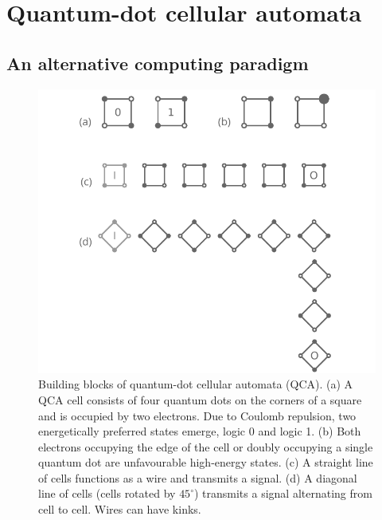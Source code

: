 \chapter{Quantum-dot cellular automata}
\label{ch:QCA_intro}
\graphicspath{{../gfx/chapter01/}}



\section{An alternative computing paradigm}

\begin{figure}
  \center
  \includegraphics{intro_qca}
  \caption{
Building blocks of quantum-dot cellular automata (QCA). (a) A QCA cell consists
of four quantum dots on the corners of a square and is occupied by two
electrons. Due to Coulomb repulsion, two energetically preferred states emerge,
logic 0 and logic 1. (b) Both electrons occupying the edge of the cell or
doubly occupying a single quantum dot are unfavourable high-energy states. (c) A
straight line of cells functions as a wire and transmits a signal. (d) A
diagonal line of cells (cells rotated by $45^{\circ}$) transmits a signal
alternating from cell to cell. Wires can have kinks.
}
  \label{fig:intro_qca}
\end{figure}
%

